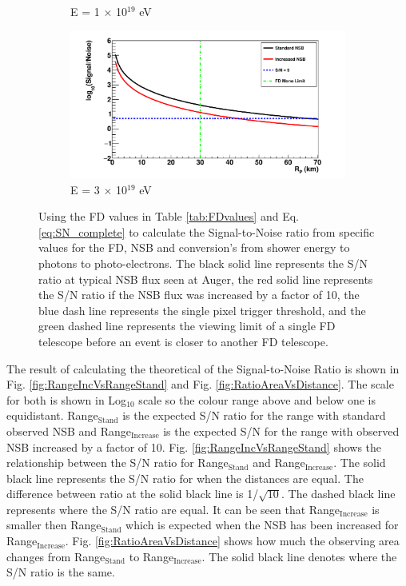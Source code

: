 \begin{figure}
\begin{subfigure}[b]{0.48\textwidth}
\caption{E = 1 $\times$ 10$^{19}$ eV}
\end{subfigure}
\hspace{3mm}
\begin{subfigure}[b]{0.48\textwidth}
\includegraphics[width=\textwidth]{chapters/graphs/SelectionEff/SignalToNoiseVsDistance_E3e19eV.pdf}
\caption{E = 3 $\times$ 10$^{19}$ eV}
\end{subfigure}
\caption{Using the FD values in Table \ref{tab:FDvalues} and Eq. \ref{eq:SN_complete} to calculate the Signal-to-Noise ratio from specific values for the FD, NSB and conversion's from shower energy to photons to photo-electrons.  The black solid line represents the S/N ratio at typical NSB flux seen at Auger, the red solid line represents the S/N ratio if the NSB flux was increased by a factor of 10, the blue dash line represents the single pixel trigger threshold, and the green dashed line represents the viewing limit of a single FD telescope before an event is closer to another FD telescope. } \label{fig:SNvsDistance}
\end{figure}

The result of calculating the theoretical of the Signal-to-Noise Ratio is shown in Fig. \ref{fig:RangeIncVsRangeStand} and Fig. \ref{fig:RatioAreaVsDistance}. The scale for both is shown in Log$_{10}$ scale so the colour range above and below one is equidistant.  Range$_{\mathrm{Stand}}$ is the expected S/N ratio for the range with standard observed NSB and Range$_{\mathrm{Increase}}$ is the expected S/N for the range with observed NSB increased by a factor of 10. Fig. \ref{fig:RangeIncVsRangeStand} shows the relationship between the S/N ratio for Range$_{\mathrm{Stand}}$ and Range$_{\mathrm{Increase}}$. The solid black line represents the S/N ratio for when the distances are equal. The difference between ratio at the solid black line is 1/$\sqrt{10}$. The dashed black line represents where the S/N ratio are equal. It can be seen that Range$_{\mathrm{Increase}}$ is smaller then Range$_{\mathrm{Stand}}$ which is expected when the NSB has been increased for Range$_{\mathrm{Increase}}$. Fig. \ref{fig:RatioAreaVsDistance} shows how much the observing area changes from Range$_{\mathrm{Stand}}$ to Range$_{\mathrm{Increase}}$. The solid black line denotes where the S/N ratio is the same.

